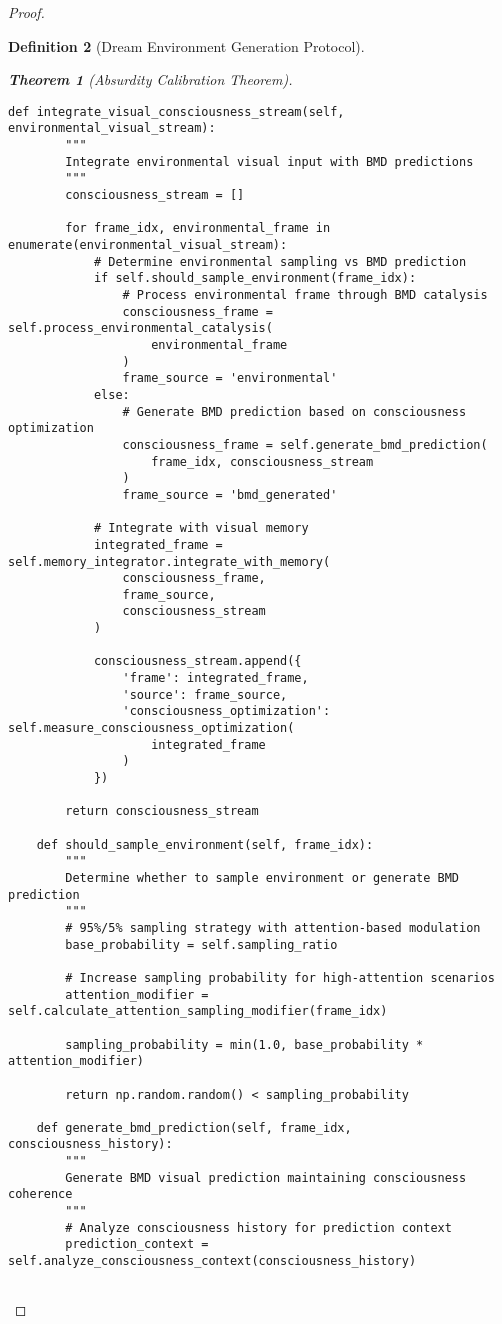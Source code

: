 \documentclass[12pt,a4paper]{article}
\newtheorem{theorem}{Theorem}[section]
\newtheorem{definition}[theorem]{Definition}
\begin{document}
\begin{proof}
\begin{definition}[Dream Environment Generation Protocol]
\begin{theorem}[Absurdity Calibration Theorem]
\begin{lstlisting}[style=pythonstyle, caption=Visual Memory BMD Integration]
    def integrate_visual_consciousness_stream(self, environmental_visual_stream):
        """
        Integrate environmental visual input with BMD predictions
        """
        consciousness_stream = []
        
        for frame_idx, environmental_frame in enumerate(environmental_visual_stream):
            # Determine environmental sampling vs BMD prediction
            if self.should_sample_environment(frame_idx):
                # Process environmental frame through BMD catalysis
                consciousness_frame = self.process_environmental_catalysis(
                    environmental_frame
                )
                frame_source = 'environmental'
            else:
                # Generate BMD prediction based on consciousness optimization
                consciousness_frame = self.generate_bmd_prediction(
                    frame_idx, consciousness_stream
                )
                frame_source = 'bmd_generated'
            
            # Integrate with visual memory
            integrated_frame = self.memory_integrator.integrate_with_memory(
                consciousness_frame,
                frame_source,
                consciousness_stream
            )
            
            consciousness_stream.append({
                'frame': integrated_frame,
                'source': frame_source,
                'consciousness_optimization': self.measure_consciousness_optimization(
                    integrated_frame
                )
            })
        
        return consciousness_stream
    
    def should_sample_environment(self, frame_idx):
        """
        Determine whether to sample environment or generate BMD prediction
        """
        # 95%/5% sampling strategy with attention-based modulation
        base_probability = self.sampling_ratio
        
        # Increase sampling probability for high-attention scenarios
        attention_modifier = self.calculate_attention_sampling_modifier(frame_idx)
        
        sampling_probability = min(1.0, base_probability * attention_modifier)
        
        return np.random.random() < sampling_probability
    
    def generate_bmd_prediction(self, frame_idx, consciousness_history):
        """
        Generate BMD visual prediction maintaining consciousness coherence
        """
        # Analyze consciousness history for prediction context
        prediction_context = self.analyze_consciousness_context(consciousness_history)
        

\end{lstlisting}
\end{theorem}
\end{definition}
\end{proof}
\end{document}
